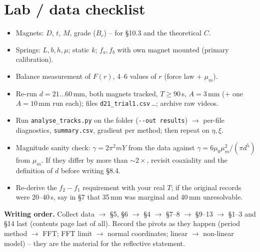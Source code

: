 \documentclass[11pt,a4paper]{article}
\newcommand{\Y}{Y}                       %
\newcommand{\muz}{\mu_0}
\newcommand{\mum}{\mu_m}
\begin{document}
\section{Lab / data checklist}
\begin{itemize}[label=$\square$]
\item Magnets: $D$, $t$, $M$, grade ($B_r$) -- for \S10.3 and the theoretical $C$.
\item Springs: $L,b,h,\mu$; static $k$; $f_a,f_b$ with own magnet mounted (primary calibration).
\item Balance measurement of $F(r)$, 4--6 values of $r$ (force law $+$ $\mum$).
\item Re-run $d=21\ldots60$\,mm, both magnets tracked, $T\ge90$\,s, $A=3$\,mm ($+$ one
$A=10$\,mm run each); files \texttt{d21\_trial1.csv}\,\ldots; archive raw videos.
\item Run \texttt{analyse\_tracks.py} on the folder (\texttt{-\/-out results}) $\to$ per-file
diagnostics, \texttt{summary.csv}, gradient per method; then repeat on $\eta,\xi$.
\item Magnitude sanity check: $\gamma=2\pi^2m\Y$ from the data against
$\gamma=6\muz\mum^2/(\pi d^5)$ from $\mum$. If they differ by more than $\sim2\times$, revisit coaxiality and the definition of
$d$ before writing \S8.4.
\item Re-derive the $f_2-f_1$ requirement with your real $T$; if the original records were
20--40\,s, say in \S7 that 35\,mm was marginal and 40\,mm unresolvable.
\end{itemize}

\textbf{Writing order.} Collect data $\to$ \S5, \S6 $\to$ \S4 $\to$ \S7--8 $\to$ \S9--13
$\to$ \S1--3 and \S14 last (contents page last of all). Record the pivots as they happen
(period method $\to$ FFT; FFT limit $\to$ normal coordinates; linear $\to$ non-linear model)
-- they are the material for the reflective statement.

\end{document}
